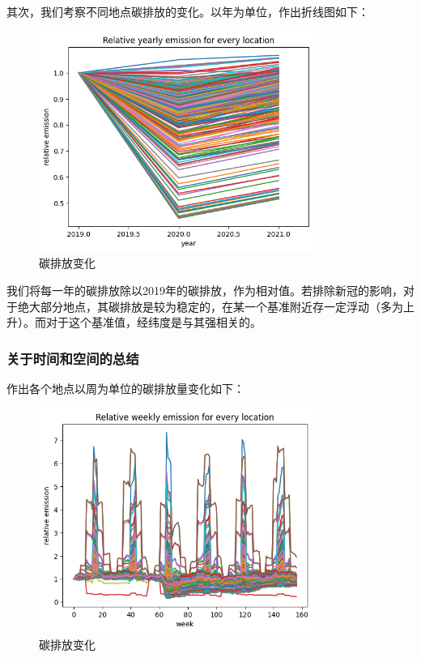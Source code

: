 \documentclass{ctexart}
\begin{document}
其次，我们考察不同地点碳排放的变化。以年为单位，作出折线图如下：

\begin{figure}[H]
      \centering
      \includegraphics[width=0.8\textwidth]{output5.png}
      \caption{碳排放变化}
\end{figure}

我们将每一年的碳排放除以2019年的碳排放，作为相对值。若排除新冠的影响，对于绝大部分地点，其碳排放是较为稳定的，在某一个基准附近存一定浮动（多为上升）。而对于这个基准值，经纬度是与其强相关的。

\subsubsection{关于时间和空间的总结}

作出各个地点以周为单位的碳排放量变化如下：

\begin{figure}[H]
      \centering
      \includegraphics[width=0.8\textwidth]{output6.png}
      \caption{碳排放变化}
\end{figure}
\end{document}
